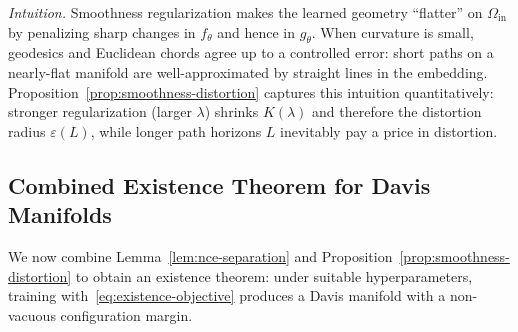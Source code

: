 \documentclass[11pt]{article}
\begin{document}
\noindent\emph{Intuition.}
Smoothness regularization makes the learned geometry ``flatter'' on $\Omega_{\mathrm{in}}$ by
penalizing sharp changes in $f_\theta$ and hence in $g_\theta$. When curvature is small, geodesics
and Euclidean chords agree up to a controlled error: short paths on a nearly-flat manifold are
well-approximated by straight lines in the embedding. Proposition~\ref{prop:smoothness-distortion}
captures this intuition quantitatively: stronger regularization (larger $\lambda$) shrinks
$K(\lambda)$ and therefore the distortion radius $\varepsilon(L)$, while longer path horizons $L$
inevitably pay a price in distortion.

\subsection{Combined Existence Theorem for Davis Manifolds}
\label{subsec:existence-main}

We now combine Lemma~\ref{lem:nce-separation} and
Proposition~\ref{prop:smoothness-distortion} to obtain an existence theorem: under suitable
hyperparameters, training with~\eqref{eq:existence-objective} produces a Davis manifold with a
non-vacuous configuration margin.
\end{document}

